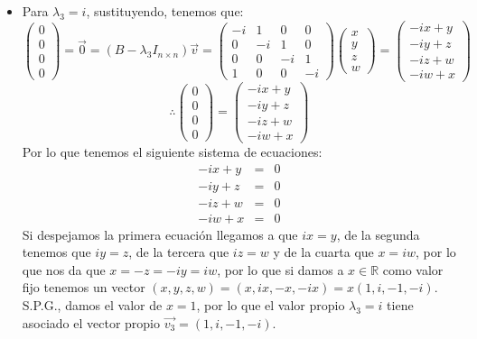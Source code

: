 \begin{enumerate}
\begin{itemize}
\item Para $\lambda_3=i$, sustituyendo, tenemos que:
    \[\begin{pmatrix}0\\
0\\0\\0\end{pmatrix}=\vec{0}=(B-\lambda_3I_{n\times n })\vec{v}=\begin{pmatrix}-i&1&0&0\\
0& -i &1& 0\\
0&0&-i&1\\
1&0&0&-i\end{pmatrix}\begin{pmatrix}x\\
y\\z\\w\end{pmatrix}=\begin{pmatrix}-ix+y\\
-iy+z\\-iz+w\\-iw+x\end{pmatrix}\]
\[\therefore \begin{pmatrix}0\\
0\\0\\0\end{pmatrix}=\begin{pmatrix}-ix+y\\
-iy+z\\-iz+w\\-iw+x\end{pmatrix}\]
Por lo que tenemos el siguiente sistema de ecuaciones:
\begin{eqnarray*}
-ix+y&=&0\\
-iy+z&=&0\\-iz+w&=&0\\-iw+x&=&0
\end{eqnarray*}
Si despejamos la primera ecuaci\'on llegamos a que $ix=y$, de la segunda tenemos que $iy=z$, de la tercera que $iz=w$ y de la cuarta que $x=iw$, por lo que nos da que $x=-z=-iy=iw$, por lo que si damos a $x\in\mathbb{R}$ como valor fijo tenemos un vector $(x,y,z,w)=(x,ix,-x,-ix)=x(1,i,-1,-i)$.\\
S.P.G., damos el valor de $x=1$, por lo que el valor propio $\lambda_3=i$ tiene asociado el vector propio $\vec{v_3}=(1,i,-1,-i)$.



\end{itemize}
\end{enumerate}
